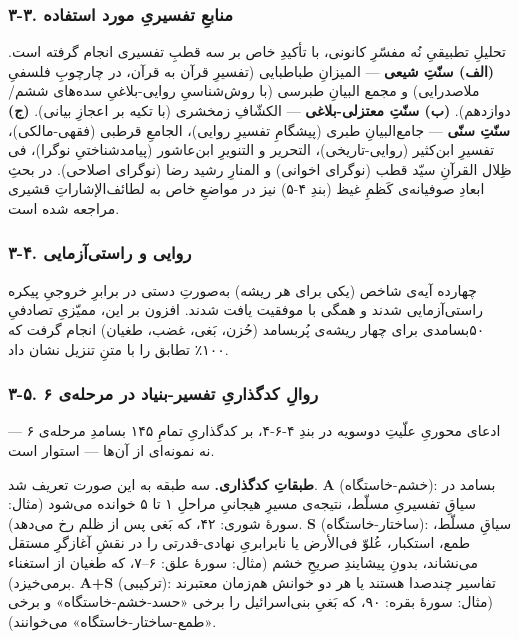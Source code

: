 \documentclass[12pt,a4paper]{article}
\begin{document}
\begin{RTL}
\begin{otherlanguage}{persian}
\subsubsection{۳-۳. منابعِ تفسیریِ مورد
استفاده}\label{ux645ux646ux627ux628ux639-ux62aux641ux633ux6ccux631ux6cc-ux645ux648ux631ux62f-ux627ux633ux62aux641ux627ux62fux647}

تحلیلِ تطبیقیِ نُه مفسّرِ کانونی، با تأکیدِ خاص بر سه قطبِ تفسیری انجام گرفته
است. \textbf{(الف) سنّتِ شیعی} --- المیزانِ طباطبایی (تفسیرِ قرآن به قرآن،
در چارچوبِ فلسفیِ ملاصدرایی) و مجمع البیانِ طبرسی (با روش‌شناسیِ روایی-بلاغیِ
سده‌های ششم/دوازدهم). \textbf{(ب) سنّتِ معتزلی-بلاغی} --- الکشّافِ زمخشری (با
تکیه بر اعجازِ بیانی). \textbf{(ج) سنّتِ سنّی} --- جامع‌البیانِ طبری (پیشگامِ
تفسیرِ روایی)، الجامعِ قرطبی (فقهی-مالکی)، تفسیرِ ابن‌کثیر (روایی-تاریخی)،
التحریر و التنویرِ ابن‌عاشور (پیامدشناختیِ نوگرا)، فی ظِلال القرآنِ سیّد قطب
(نوگرای اخوانی) و المنارِ رشید رضا (نوگرای اصلاحی). در بحثِ ابعادِ صوفیانه‌ی
کَظمِ غیظ (بندِ ۴-۵) نیز در مواضعِ خاص به لطائف‌الإشاراتِ قشیری مراجعه شده
است.

\subsubsection{۳-۴. روایی و
راستی‌آزمایی}\label{ux631ux648ux627ux6ccux6cc-ux648-ux631ux627ux633ux62aux6ccux622ux632ux645ux627ux6ccux6cc}

چهارده آیه‌ی شاخص (یکی برای هر ریشه) به‌صورتِ دستی در برابرِ خروجیِ پیکره
راستی‌آزمایی شدند و همگی با موفقیت یافت شدند. افزون بر این، ممیّزیِ تصادفیِ
۵۰‌بسامدی برای چهار ریشه‌ی پُربسامد (حُزن، بَغی، غضب، طغیان) انجام گرفت که
۱۰۰٪ تطابق را با متنِ تنزیل نشان داد.

\subsubsection{۳-۵. روالِ کدگذاریِ تفسیر-بنیاد در مرحله‌ی
۶}\label{ux631ux648ux627ux644-ux6a9ux62fux6afux630ux627ux631ux6cc-ux62aux641ux633ux6ccux631-ux628ux646ux6ccux627ux62f-ux62fux631-ux645ux631ux62dux644ux647ux6cc-ux6f6}

ادعای محوریِ علّیتِ دوسویه در بندِ ۴-۶-۴، بر کدگذاریِ تمامِ ۱۴۵ بسامدِ مرحله‌ی ۶
--- نه نمونه‌ای از آن‌ها --- استوار است.

\textbf{طبقاتِ کدگذاری.} سه طبقه به این صورت تعریف شد. \textbf{A}
(خشم-خاستگاه): بسامد در سیاقِ تفسیریِ مسلّط، نتیجه‌ی مسیرِ هیجانیِ مراحلِ ۱ تا
۵ خوانده می‌شود (مثال: سورۀ شوری: ۴۲، که بَغی پس از ظلم رخ می‌دهد).
\textbf{S} (ساختار-خاستگاه): سیاقِ مسلّط، طمع، استکبار، عُلوّ فی‌الأرض یا
نابرابریِ نهادی-قدرتی را در نقشِ آغازگرِ مستقل می‌نشاند، بدونِ پیشایندِ صریحِ
خشم (مثال: سورۀ علق: ۶--۷، که طغیان از استغناء برمی‌خیزد). \textbf{A+S}
(ترکیبی): تفاسیر چندصدا هستند یا هر دو خوانش هم‌زمان معتبرند (مثال: سورۀ
بقره: ۹۰، که بَغیِ بنی‌اسرائیل را برخی «حسد-خشم-خاستگاه» و برخی
«طمع-ساختار-خاستگاه» می‌خوانند).


\end{otherlanguage}
\end{RTL}
\end{document}
